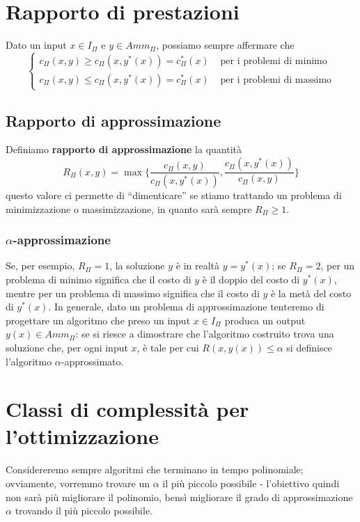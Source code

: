 \section{Rapporto di prestazioni}
Dato un input $x \in I_{\Pi}$ e $y \in Amm_{\Pi}$, possiamo sempre affermare che 
$$
\begin{cases}
  c_{\Pi}(x,y) \geq c_{\Pi}(x,y^*(x)) = c_{\Pi}^*(x) & \text{ per i problemi di minimo} \\
  c_{\Pi}(x,y) \leq c_{\Pi}(x,y^*(x)) = c_{\Pi}^*(x) & \text{ per i problemi di massimo}
\end{cases}
$$

\subsection{Rapporto di approssimazione}
Definiamo \textbf{rapporto di approssimazione} la quantità
$$
R_{\Pi}(x,y) = \max\{\frac{c_{\Pi}(x,y)}{c_{\Pi}(x, y^*(x))}, \frac{c_{\Pi}(x,y^*(x))}{c_{\Pi}(x, y)}\}
$$
questo valore ci permette di ``dimenticare'' se stiamo trattando un problema di 
minimizzazione o massimizzazione, in quanto sarà sempre $R_{\Pi} \geq 1$.

\subsubsection{$\alpha$-approssimazione}
Se, per esempio, $R_{\Pi} = 1$, la soluzione $y$ è in realtà $y = y^*(x)$; se
$R_{\Pi} = 2$, per un problema di minimo significa che il costo di $y$ è il
doppio del costo di $y^*(x)$, mentre per un problema di massimo significa che il
costo di $y$ è la metà del costo di $y^*(x)$. In generale, dato un problema di
approssimazione tenteremo di progettare un algoritmo che preso un input $x \in
I_{\Pi}$ produca un output $y(x) \in Amm_{\Pi}$: se si riesce a dimostrare che
l'algoritmo costruito trova una soluzione che, per ogni input $x$, è tale per
cui $R(x,y(x)) \leq \alpha$ si definisce l'algoritmo $\alpha$-approssimato.

\section{Classi di complessità per l'ottimizzazione}
Considereremo sempre algoritmi che terminano in tempo polinomiale; ovviamente, 
vorremmo trovare un $\alpha$ il più piccolo possibile - l'obiettivo quindi non sarà
più migliorare il polinomio, bensì migliorare il grado di approssimazione $\alpha$
trovando il più piccolo possibile. 

